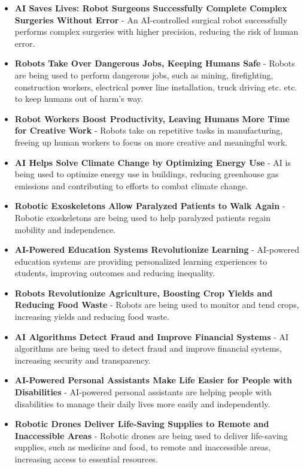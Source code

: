 \documentclass{article}
\begin{document}
\begin{itemize}
\item \textbf{AI Saves Lives: Robot Surgeons Successfully Complete Complex Surgeries Without Error} - An AI-controlled surgical robot successfully performs complex surgeries with higher precision, reducing the risk of human error.
\item \textbf{Robots Take Over Dangerous Jobs, Keeping Humans Safe} - Robots are being used to perform dangerous jobs, such as mining, firefighting, construction workers, electrical power line installation, truck driving etc. etc. to keep humans out of harm's way.
\item \textbf{Robot Workers Boost Productivity, Leaving Humans More Time for Creative Work} - Robots take on repetitive tasks in manufacturing, freeing up human workers to focus on more creative and meaningful work.
\item \textbf{AI Helps Solve Climate Change by Optimizing Energy Use} - AI is being used to optimize energy use in buildings, reducing greenhouse gas emissions and contributing to efforts to combat climate change.
\item \textbf{Robotic Exoskeletons Allow Paralyzed Patients to Walk Again} - Robotic exoskeletons are being used to help paralyzed patients regain mobility and independence.
\item \textbf{AI-Powered Education Systems Revolutionize Learning} - AI-powered education systems are providing personalized learning experiences to students, improving outcomes and reducing inequality.
\item \textbf{Robots Revolutionize Agriculture, Boosting Crop Yields and Reducing Food Waste} - Robots are being used to monitor and tend crops, increasing yields and reducing food waste.
\item \textbf{AI Algorithms Detect Fraud and Improve Financial Systems} - AI algorithms are being used to detect fraud and improve financial systems, increasing security and transparency.
\item \textbf{AI-Powered Personal Assistants Make Life Easier for People with Disabilities} - AI-powered personal assistants are helping people with disabilities to manage their daily lives more easily and independently.
\item \textbf{Robotic Drones Deliver Life-Saving Supplies to Remote and Inaccessible Areas} - Robotic drones are being used to deliver life-saving supplies, such as medicine and food, to remote and inaccessible areas, increasing access to essential resources.

\end{itemize}
\end{document}
